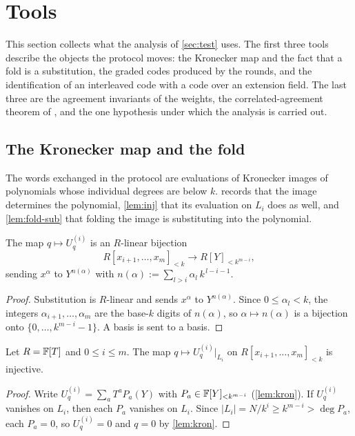 \section{Tools}\label{sec:tools}

This section collects what the analysis of \cref{sec:test} uses. The first three tools describe
the objects the protocol moves: the Kronecker map and the fact that a fold is a substitution, the
graded codes produced by the rounds, and the identification of an interleaved code with a code over
an extension field. The last three are the agreement invariants of the weights, the
correlated-agreement theorem of \cite{BCIKS20}, and the one hypothesis under which the analysis is
carried out.

\subsection{The Kronecker map and the fold}\label{sec:kron}

The words exchanged in the protocol are evaluations of Kronecker images of polynomials whose
individual degrees are below $k$.  records that the image determines the
polynomial, \cref{lem:inj} that its evaluation on $L_i$ does as well, and \cref{lem:fold-sub}
that folding the image is substituting into the polynomial.

\begin{lemma}\label{lem:kron}
The map $q\mapsto U^{(i)}_q$ is an $R$-linear bijection
\[
R[x_{i+1},\dots,x_m]_{<k}\longrightarrow R[Y]_{<k^{m-i}},
\]
sending $x^\alpha$ to $Y^{n(\alpha)}$ with $n(\alpha):=\sum_{l>i}\alpha_l\,k^{\,l-i-1}$.
\end{lemma}

\begin{proof}
Substitution is $R$-linear and sends $x^\alpha$ to $Y^{n(\alpha)}$. Since $0\le\alpha_l<k$, the
integers $\alpha_{i+1},\dots,\alpha_m$ are the base-$k$ digits of $n(\alpha)$, so
$\alpha\mapsto n(\alpha)$ is a bijection onto $\{0,\dots,k^{m-i}-1\}$. A basis is sent to a basis.
\end{proof}

\begin{lemma}\label{lem:inj}
Let $R=\mathbb{F}[T]$ and $0\le i\le m$. The map $q\mapsto U^{(i)}_q\big|_{L_i}$ on
$R[x_{i+1},\dots,x_m]_{<k}$ is injective.
\end{lemma}

\begin{proof}
Write $U^{(i)}_q=\sum_aT^aP_a(Y)$ with $P_a\in\mathbb{F}[Y]_{<k^{m-i}}$ (\cref{lem:kron}). If
$U^{(i)}_q$ vanishes on $L_i$, then each $P_a$ vanishes on $L_i$. Since
$|L_i|=N/k^i\ge k^{m-i}>\deg P_a$, each $P_a=0$, so $U^{(i)}_q=0$ and $q=0$ by \cref{lem:kron}.
\end{proof}

